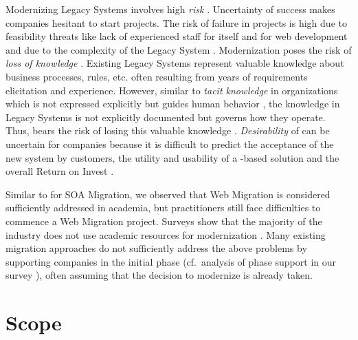 Modernizing \glspl{Legacy System} involves high \emph{risk} \autocite{ISO/IEEE24765Vocabulary,Khadka2014ProfessionalsModernization,Canfora2000Decomposing,Bisbal1999LegacyInformationSystems,Seacord2003ModernizingLS,Heil2018ReWaMP}.
Uncertainty of success makes companies hesitant to start projects.
The risk of failure in  projects is high \autocite{Gartner2014ModernizationFailure,ForresterResearch2011Modernization} due to feasibility threats like lack of experienced staff for  itself \autocite{Sneed2010SoftwareMigration,Seacord2003ModernizingLS} and for \Gls{web} development and due to the complexity of the \gls{Legacy System} \autocite{Khadka2014ProfessionalsModernization}.
Modernization poses the risk of \emph{loss of knowledge} \autocite{Khadka2014ProfessionalsModernization}.
Existing \glspl{Legacy System} represent valuable knowledge about business processes, rules, etc.
\autocite{Aversano2001,Sneed2010SoftwareMigration,Wagner2014} often resulting from years of requirements elicitation and experience.
However, similar to \emph{tacit knowledge} in organizations which is not expressed explicitly but guides human behavior \autocite{Nonaka2008TacitKnowledge}, the knowledge in \glspl{Legacy System} is not explicitly documented but governs how they operate.
Thus,  bears the risk of losing this valuable knowledge \autocite{Khadka2014ProfessionalsModernization}.
\emph{Desirability} of  can be uncertain for companies because it is difficult to predict the acceptance of the new system by customers, the utility and usability of a -based solution and the overall Return on Invest \autocite{Khadka2014ProfessionalsModernization}.

Similar to \autocite{Razavian2013PHD} for SOA Migration, we observed that \gls{Web Migration} is considered sufficiently addressed in academia, but practitioners still face difficulties to commence a \gls{Web Migration} project.
Surveys show that the majority of the industry does not use academic resources for modernization \autocite{Batlajery2014IndustrialSurveyModernization}.
Many existing migration approaches do not sufficiently address the above problems by supporting companies in the initial phase (cf.~analysis of phase support in our survey \autocite{Heil2017Survey}), often assuming that the decision to modernize is already taken.

\hypertarget{sec:scope}{%
\section{Scope}\label{sec:scope}}

